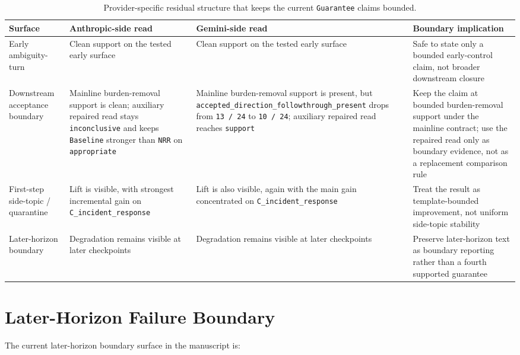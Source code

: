 \documentclass[11pt]{article}
\begin{document}
\begin{table}[ht]
\centering
\begin{tabular}{|p{}|p{}|p{}|p{}|}
\hline
\textbf{Surface} & \textbf{Anthropic-side read} & \textbf{Gemini-side read} & \textbf{Boundary implication} \\
\hline
Early ambiguity-turn & Clean support on the tested early surface & Clean support on the tested early surface & Safe to state only a bounded early-control claim, not broader downstream closure \\
\hline
Downstream acceptance boundary & Mainline burden-removal support is clean; auxiliary repaired read stays \texttt{inconclusive} and keeps \texttt{Baseline} stronger than \texttt{NRR} on \texttt{appropriate} & Mainline burden-removal support is present, but \texttt{accepted\_direction\_followthrough\_present} drops from \texttt{13 / 24} to \texttt{10 / 24}; auxiliary repaired read reaches \texttt{support} & Keep the claim at bounded burden-removal support under the mainline contract; use the repaired read only as boundary evidence, not as a replacement comparison rule \\
\hline
First-step side-topic / quarantine & Lift is visible, with strongest incremental gain on \texttt{C\_incident\_response} & Lift is also visible, again with the main gain concentrated on \texttt{C\_incident\_response} & Treat the result as template-bounded improvement, not uniform side-topic stability \\
\hline
Later-horizon boundary & Degradation remains visible at later checkpoints & Degradation remains visible at later checkpoints & Preserve later-horizon text as boundary reporting rather than a fourth supported guarantee \\
\hline
\end{tabular}
\caption{Provider-specific residual structure that keeps the current
\texttt{Guarantee} claims bounded.}
\end{table}

\section{Later-Horizon Failure Boundary}

The current later-horizon boundary surface in the manuscript is:
\end{document}
